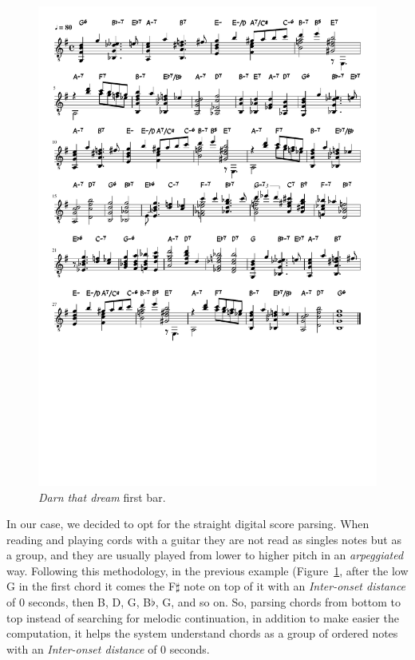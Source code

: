 \begin{itemize}
\begin{figure}[ht!]
    \centering
    \includegraphics[clip, trim=0cm 26cm 14.5cm 1.5cm]{Figures/Darn_that_dream.pdf}
    \caption{\textit{Darn that dream} first bar.}
    \label{fig:first_chord}    
\end{figure}

In our case, we decided to opt for the straight digital score parsing. When reading and playing cords with a guitar they are not read as singles notes but as a group, and they are usually played from lower to higher pitch in an \textit{arpeggiated} way. Following this methodology, in the previous example (Figure~\ref{fig:first_chord}, after the low G in the first chord it comes the F$\sharp$ note on top of it with an \textit{Inter-onset distance} of 0 seconds, then B, D, G, B$\flat$, G, and so on. So, parsing chords from bottom to top instead of searching for melodic continuation, in addition to make easier the computation, it helps the system understand chords as a group of ordered notes with an \textit{Inter-onset distance} of 0 seconds. 


\end{itemize}
